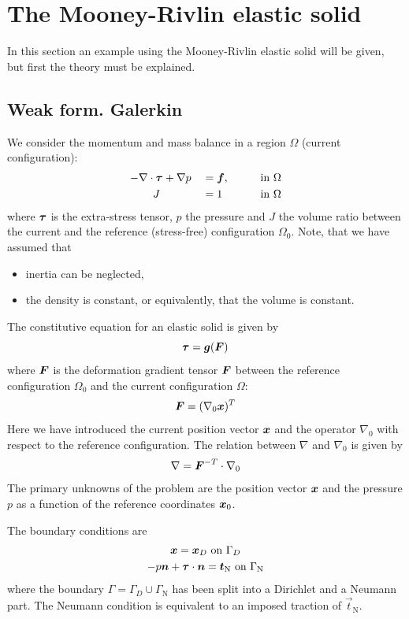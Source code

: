 
\def\headdate{1st July 2015}

\section{The Mooney-Rivlin elastic solid}
\label{sec:elasticsolid}

In this section an example using the Mooney-Rivlin elastic solid will be
given, but first the theory must be explained.

\subsection{Weak form. Galerkin \fem}

We consider the momentum and mass balance 
in a region $\Omega$ (current configuration):
\begin{alignat}{3}
 -&\nabla\cdot\boldsymbol{\tau}+\nabla p & &=\boldsymbol{f},&&\qquad\text{in }\Omega
       \label{eq:Mooney1} \\
   &\hspace*{3ex}J& &=1&&\qquad\text{in }\Omega \label{eq:Mooney2}
\end{alignat}
where $\boldsymbol{\tau}$ is the extra-stress tensor, $p$ the pressure and $J$ the
volume ratio between the current and the reference (stress-free)
configuration $\Omega_0$. Note, that we have assumed that 
\begin{itemize}
   \item inertia can be neglected,
   \item the density is constant, or equivalently, that the volume is constant.
\end{itemize}
The constitutive equation for an elastic solid is given by
\[
   \boldsymbol{\tau} = \boldsymbol{g}(\boldsymbol{F})
\]
where $\boldsymbol{F}$ is the deformation gradient tensor $\boldsymbol{F}$ between the
reference configuration
$\Omega_0$ and the current configuration $\Omega$: 
\[
    \boldsymbol{F}=(\nabla_0\boldsymbol{x})^T
\]
Here we have introduced  the current position vector $\boldsymbol{x}$ and
the operator $\nabla_0$ with respect to the reference
configuration. The relation between $\nabla$ and $\nabla_0$ is given by
\begin{equation}
 \nabla = \boldsymbol{F}^{-T}\cdot\nabla_0 \label{eq:nablamap}   
\end{equation}
The primary unknowns of the problem are the position vector $\boldsymbol{x}$ and the
pressure $p$ as a function of the reference coordinates $\boldsymbol{x}_0$.

The boundary conditions are
\begin{gather}
    \boldsymbol{x} = \boldsymbol{x}_D\text{ on }\Gamma_D\\
    -p\boldsymbol{n}+\boldsymbol{\tau}\cdot\boldsymbol{n}=\boldsymbol{t}_{\text{N}}\text{ on }\Gamma_{\text{N}}
\end{gather}
where the boundary $\Gamma=\Gamma_D\cup\Gamma_{\text{N}}$ has been split into a
Dirichlet and a Neumann part. The Neumann condition is equivalent
to an imposed traction of $\vec t_{\text{N}}$.
                                                                                
